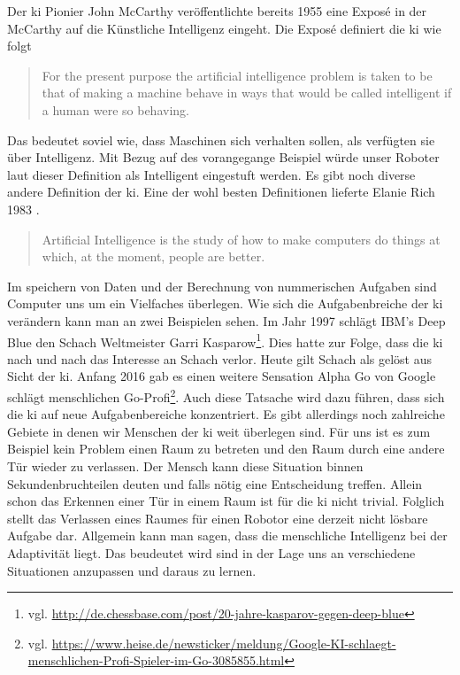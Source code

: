 Der \ac{ki} Pionier John McCarthy \cite{PROPOSALMcCarthy} veröffentlichte bereits 1955 eine Exposé in der McCarthy auf die Künstliche Intelligenz eingeht. Die Exposé definiert die \ac{ki} wie folgt 
\begin{quote}
		For the present purpose the artificial intelligence problem is taken to be that of making a machine behave in ways that would be called intelligent if a human were so behaving.
\end{quote}
Das bedeutet soviel wie, dass Maschinen sich verhalten sollen, als verfügten sie über Intelligenz. Mit Bezug auf des vorangegange Beispiel würde unser Roboter laut dieser Definition als Intelligent eingestuft werden. \linebreak
Es gibt noch diverse andere Definition der \ac{ki}. Eine der wohl besten Definitionen lieferte Elanie Rich 1983 \cite{ArtificialIntelligence}. 
\begin{quote}
		Artificial Intelligence is the study of how to make computers do things at which, at the moment, people are better.
\end{quote}
Im speichern von Daten und der Berechnung von nummerischen Aufgaben sind Computer uns um ein Vielfaches überlegen. 
Wie sich die Aufgabenbreiche der \ac{ki} verändern kann man an zwei Beispielen sehen. Im Jahr 1997 schlägt IBM's Deep Blue den Schach Weltmeister Garri Kasparow\footnote{vgl. \url{http://de.chessbase.com/post/20-jahre-kasparov-gegen-deep-blue}}. Dies hatte zur Folge, dass die \ac{ki} nach und nach das Interesse an Schach verlor. Heute gilt Schach als gelöst aus Sicht der \ac{ki}. Anfang 2016 gab es einen weitere Sensation Alpha Go von Google schlägt menschlichen Go-Profi\footnote{vgl. \url{https://www.heise.de/newsticker/meldung/Google-KI-schlaegt-menschlichen-Profi-Spieler-im-Go-3085855.html}}. Auch diese Tatsache wird dazu führen, dass sich die \ac{ki} auf neue Aufgabenbereiche konzentriert. Es gibt allerdings noch zahlreiche Gebiete in denen wir Menschen der \ac{ki} weit überlegen sind. Für uns ist es zum Beispiel kein Problem einen Raum zu betreten und den Raum durch eine andere Tür wieder zu verlassen. Der Mensch kann diese Situation binnen Sekundenbruchteilen deuten und falls nötig eine Entscheidung treffen. Allein schon das Erkennen einer Tür in einem Raum ist für die \ac{ki} nicht trivial. Folglich stellt das Verlassen eines Raumes für einen Robotor eine derzeit nicht lösbare Aufgabe dar. \linebreak
Allgemein kann man sagen, dass die menschliche Intelligenz bei der Adaptivität liegt. Das beudeutet wird sind in der Lage uns an verschiedene Situationen anzupassen und daraus zu lernen.   

